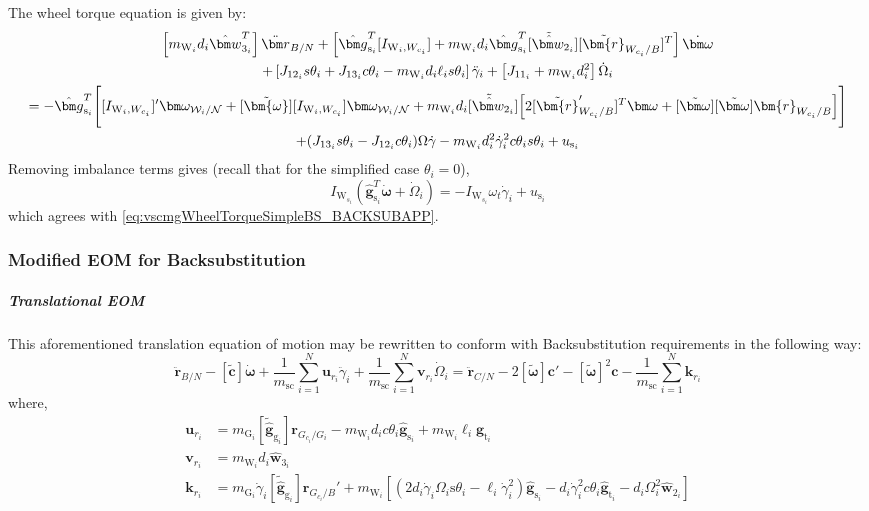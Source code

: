 The wheel torque equation is given by:
\begin{multline}
		\left[ m_{\text{W}_i}d_i\hat{\bm w}_{3_i}^T \right] \ddot{\bm r}_{B/N} + \left[ \hat{\bm g}_{\text{s}_i}^T[I_{\text{W}_i,W_{c_i}}] + m_{\text{W}_i}d_i\hat{\bm g}_{\text{s}_i}^T[\tilde{\hat{\bm w}}_{2_i}][\tilde{\bm{r}}_{W_{c_i}/B}]^T \right] \dot{\bm\omega}
		\\
		+\left[ J_{12_i}s\theta_i + J_{13_i}c\theta_i - m_{\text{W}_i}d_i\ell_is\theta_i \right] \ddot{\gamma}_i
		+ \left[ J_{11_i}  + m_{\text{W}_i}d_i^2 \right] \dot{\Omega}_i
		\\
		=-\hat{\bm g}_{\text{s}_i}^T \Bigg[ [I_{\text{W}_i,W_{c_i}}]'\bm\omega_{\mathcal{W}_i/\cal N} + [\tilde{\bm{\omega}}][I_{\text{W}_i,W_{c_i}}]\bm\omega_{\mathcal{W}_i/\cal N}  + m_{\text{W}_i}d_i[\tilde{\hat{\bm w}}_{2_i}] \Big[ 2[\tilde{\bm{r}}'_{W_{c_i}/B}]^T\bm\omega + [\tilde{\bm\omega}][\tilde{\bm\omega}]\bm{r}_{W_{c_i}/B}
		\Big] \Bigg] \\+(J_{13_i}s\theta_i - J_{12_i}c\theta_i)\Omega\dot{\gamma} - m_{\text{W}_i}d_i^2\dot{\gamma}_i^2c\theta_is\theta_i
		+ u_{\text{s}_i}
\end{multline}
Removing imbalance terms gives (recall that for the simplified case $\theta_i = 0$),
\begin{equation}
	I_{\text{W}_{s_i}}(\hat{\bm g}_{\text{s}_i}^T\dot{\bm\omega} + \dot{\Omega}_i)
	=-I_{\text{W}_{s_i}}\omega_t\dot{\gamma}_i + u_{\text{s}_i}
\end{equation}
which agrees with \eqref{eq:vscmgWheelTorqueSimpleBS_BACKSUBAPP}.

\subsubsection{Modified EOM for Backsubstitution}

\subparagraph{Translational EOM}

This aforementioned translation equation of motion may be rewritten to conform with Backsubstitution requirements in the following way:
\begin{equation}
\ddot{\bm r}_{B/N} - [\tilde{\bm{c}}]\dot{\bm \omega} + \frac{1}{m_{\text{sc}}} \sum\limits_{i=1}^{N}\bm{u}_{r_i}\ddot{\gamma}_i + \frac{1}{m_{\text{sc}}} \sum\limits_{i=1}^{N}\bm{v}_{r_i}\dot{\Omega}_i = \ddot{\bm r}_{C/N} - 2[\tilde{\bm{\omega}}]\bm{c}' - [\tilde{\bm{\omega}}]^2\bm{c} - \frac{1}{m_{\text{sc}}} \sum\limits_{i=1}^{N}\bm{k}_{r_i}
\label{eq:transabbr}
\end{equation}
where,
\begin{align}
\bm{u}_{r_i} &= m_{\text{G}_i}[\tilde{\hat{\bm g}}_{\text{g}_i}] \bm{r}_{G_{c_i}/G_i} - m_{\text{W}_i}d_ic\theta_i\hat{\bm{g}}_{\text{s}_i} + m_{\text{W}_i}\ell_i\hat{\bm{g}}_{\text{t}_i}
\\
\bm{v}_{r_i} &= m_{\text{W}_i}d_i\hat{\bm w}_{3_i}
\\
\bm{k}_{r_i} &= m_{\text{G}_i}\dot{\gamma}_i[\tilde{\hat{\bm g}}_{\text{g}_i}] \bm{r}_{G_{c_i}/B}'
+ m_{\text{W}_i} \left[ \left(2d_i\dot{\gamma}_i\Omega_i\text{s}\theta_i - \ell_i\dot{\gamma}_i^2\right)\hat{\bm{g}}_{\text{s}_i} - d_i\dot{\gamma}_i^2c\theta_i\hat{\bm{g}}_{\text{t}_i} - d_i\Omega_i^2 \hat{\bm{w}}_{2_i} \right]
\end{align}

